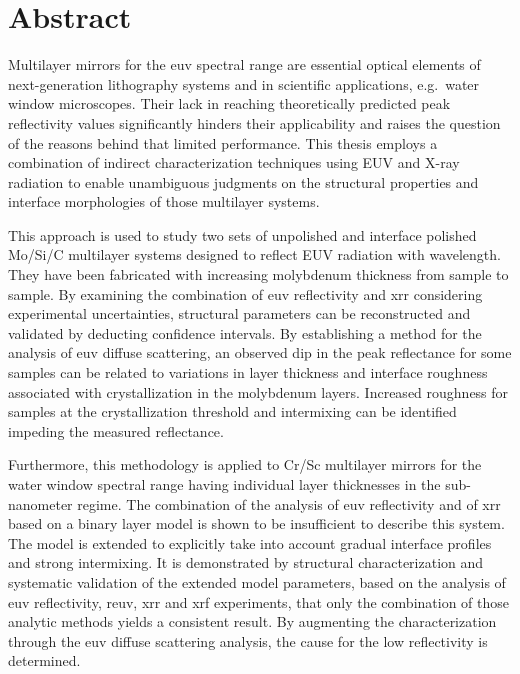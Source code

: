 \section*{Abstract}

\thispagestyle{empty}

    Multilayer mirrors for the \gls{euv} spectral range are essential optical elements of next-generation lithography systems and in scientific applications, e.g.~water window microscopes. Their lack in reaching theoretically predicted peak reflectivity values significantly hinders their applicability and raises the question of the reasons behind that limited performance. This thesis employs a combination of indirect characterization techniques using EUV and X-ray radiation to enable unambiguous judgments on the structural properties and interface morphologies of those multilayer systems.
    
    This approach is used to study two sets of unpolished and interface polished Mo/Si/C multilayer systems designed to reflect EUV radiation with  wavelength. They have been fabricated with increasing molybdenum thickness from sample to sample. By examining the combination of \gls{euv} reflectivity and \gls{xrr} considering experimental uncertainties, structural parameters can be reconstructed and validated by deducting confidence intervals. By establishing a method for the analysis of \gls{euv} diffuse scattering, an observed dip in the peak reflectance for some samples can be related to variations in layer thickness and interface roughness associated with crystallization in the molybdenum layers. Increased roughness for samples at the crystallization threshold and intermixing can be identified impeding the measured reflectance.
    
    Furthermore, this methodology is applied to Cr/Sc multilayer mirrors for the water window spectral range having individual layer thicknesses in the sub-nanometer regime. The combination of the analysis of \gls{euv} reflectivity and of \gls{xrr} based on a binary layer model is shown to be insufficient to describe this system. The model is extended to explicitly take into account gradual interface profiles and strong intermixing. It is demonstrated by structural characterization and systematic validation of the extended model parameters, based on the analysis of \gls{euv} reflectivity, \gls{reuv}, \gls{xrr} and \gls{xrf} experiments, that only the combination of those analytic methods yields a consistent result. By augmenting the characterization through the \gls{euv} diffuse scattering analysis, the cause for the low reflectivity is determined.

